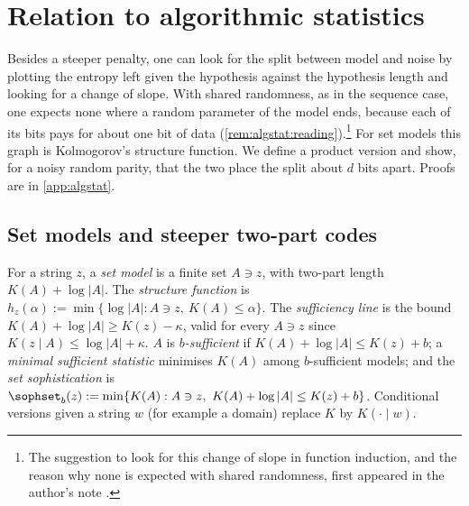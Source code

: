 \section{Relation to algorithmic statistics}\label{sec:algstat}

Besides a steeper penalty, one can look for the split between model and noise by plotting the entropy left given the hypothesis against the hypothesis length and looking for a change of slope. With shared randomness, as in the sequence case, one expects none where a random parameter of the model ends, because each of its bits pays for about one bit of data (\cref{rem:algstat:reading}).\footnote{The suggestion to look for this change of slope in function induction, and the reason why none is expected with shared randomness, first appeared in the author's note \citep{hanni2026grokking}.} For set models this graph is Kolmogorov's structure function. We define a product version and show, for a noisy random parity, that the two place the split about $d$ bits apart. Proofs are in \cref{app:algstat}.

\subsection{Set models and steeper two-part codes}\label{sec:algstat:set}

\begin{definition}\label{def:algstat:set}
For a string $z$, a \emph{set model} is a finite set $A\ni z$, with two-part length $K(A)+\log|A|$. The \emph{structure function} is $h_z(\alpha):=\min\{\log|A|:A\ni z,\ K(A)\le\alpha\}$. The \emph{sufficiency line} is the bound $K(A)+\log|A|\ge K(z)-\kappa$, valid for every $A\ni z$ since $K(z\mid A)\le\log|A|+\kappa$. $A$ is \emph{$b$-sufficient} if $K(A)+\log|A|\le K(z)+b$; a \emph{minimal sufficient statistic} minimises $K(A)$ among $b$-sufficient models; and the \emph{set sophistication} is $\sophset_b(z):=\min\{K(A):A\ni z,\ K(A)+\log|A|\le K(z)+b\}$. Conditional versions given a string $w$ (for example a domain) replace $K$ by $K(\cdot\mid w)$.
\end{definition}


